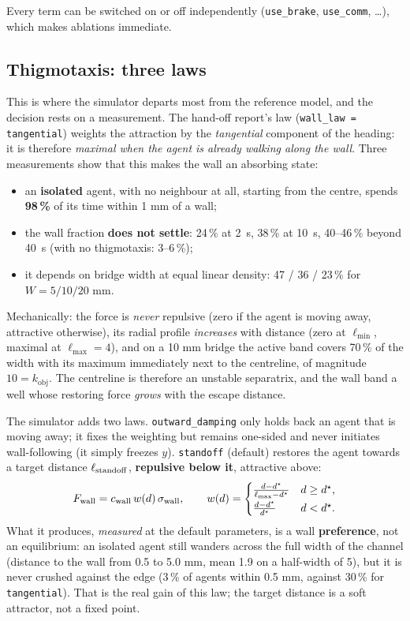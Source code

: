 \documentclass[11pt,a4paper]{article}
\newcommand{\obj}{\mathrm{obj}}
\newcommand{\code}[1]{\texttt{#1}}
\begin{document}
Every term can be switched on or off independently (\code{use\_brake},
\code{use\_comm}, \ldots), which makes ablations immediate.

\subsection{Thigmotaxis: three laws}\label{sec:wall}

This is where the simulator departs most from the reference model, and the
decision rests on a measurement. The hand-off report's law
(\code{wall\_law = tangential}) weights the attraction by the \emph{tangential}
component of the heading: it is therefore \emph{maximal when the agent is
already walking along the wall}. Three measurements show that this makes the
wall an absorbing state:

\begin{itemize}\itemsep2pt
\item an \textbf{isolated} agent, with no neighbour at all, starting from the
      centre, spends \textbf{98\,\%} of its time within 1 mm of a wall;
\item the wall fraction \textbf{does not settle}: 24\,\% at 2~s, 38\,\% at
      10~s, 40--46\,\% beyond 40~s (with no thigmotaxis: 3--6\,\%);
\item it depends on bridge width at equal linear density:
      47 / 36 / 23\,\% for $W=5/10/20$ mm.
\end{itemize}

Mechanically: the force is \emph{never} repulsive (zero if the agent is moving
away, attractive otherwise), its radial profile \emph{increases} with distance
(zero at $\ell_{\min}$, maximal at $\ell_{\max}=4$), and on a 10 mm bridge the
active band covers 70\,\% of the width with its maximum immediately next to the
centreline, of magnitude $10 = k_\obj$. The centreline is therefore an unstable
separatrix, and the wall band a well whose restoring force \emph{grows} with the
escape distance.

The simulator adds two laws. \code{outward\_damping} only holds back an agent
that is moving away; it fixes the weighting but remains one-sided and never
initiates wall-following (it simply freezes $y$). \code{standoff} (default)
restores the agent towards a target distance $\ell_{\rm standoff}$,
\textbf{repulsive below it}, attractive above:
\[
F_{\rm wall} = c_{\rm wall}\,w(d)\,\sigma_{\rm wall},
\qquad
w(d)=\begin{cases}\frac{d-d^\star}{\ell_{\max}-d^\star} & d\geq d^\star,\\[2pt]
\frac{d-d^\star}{d^\star} & d<d^\star.\end{cases}
\]
What it produces, \emph{measured} at the default parameters, is a wall
\textbf{preference}, not an equilibrium: an isolated agent still wanders across
the full width of the channel (distance to the wall from 0.5 to 5.0 mm, mean
1.9 on a half-width of 5), but it is never crushed against the edge (3\,\% of
agents within 0.5 mm, against 30\,\% for \code{tangential}). That is the real
gain of this law; the target distance is a soft attractor, not a fixed point.
\end{document}
